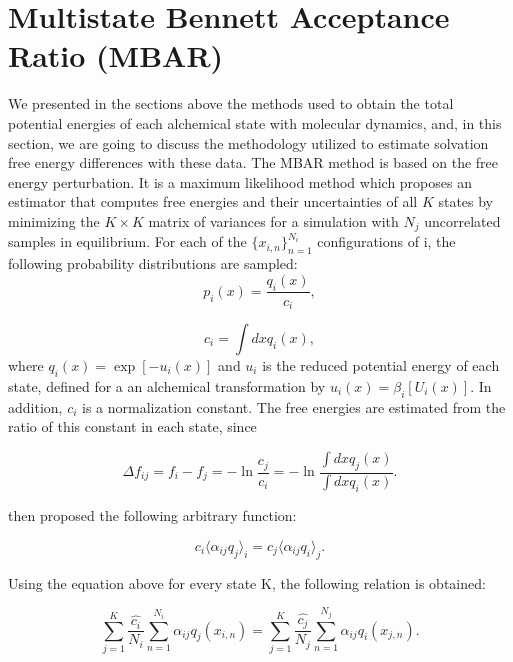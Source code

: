 \section{Multistate Bennett Acceptance Ratio (MBAR)}\label{mbar}

We presented in the sections above the methods used to obtain the total potential energies of each alchemical state with molecular dynamics, and, in this section, we are going to discuss the methodology utilized to estimate solvation free energy differences with these data. The MBAR method \cite{mbar} is based on the free energy perturbation. It is a maximum likelihood method which proposes an estimator that computes free energies and their uncertainties of all $K$ states by minimizing the $K \times K$ matrix of variances for a simulation with $N_{j}$ uncorrelated samples in equilibrium. For each of the $\lbrace x_{i,n } \rbrace ^{N_{i}}_{n=1 }$ configurations of i, the following probability distributions are sampled:
\begin{equation}
p_{i}(x) = \frac{q_{i}(x)}{c_{i}},
\end{equation}

\begin{equation}
c_{i} = \int dx q_{i}(x),
\end{equation}
where $q_{i}(x)=\exp[-u_{i}(x)]$ and $u_{i}$ is the reduced potential energy of each state, defined for a an alchemical transformation by $u_{i} (x)= \beta_{i} [U_{i}(x)]$. In addition, $c_{i}$ is a normalization constant.  The free energies are estimated from the ratio of this constant in each state, since

\begin{equation}
\Delta f_{ij} = f_{i} - f_{j} = - \ln \frac{c_{j}}{c_{i}}  = -\ln \frac{\int dx q_{j}(x)}{\int dx q_{i}(x)} .
\label{eqn:mbar1}
\end{equation}

 then proposed the following arbitrary function:

\begin{equation}
c_{i} \langle \alpha _{ij} q_{j} \rangle _{i}  =  c_{j} \langle \alpha _{ij} q_{i} \rangle _{j} .
\end{equation}

Using the equation above for every state  K, the following relation is obtained:

\begin{equation}
\label{eq:mbar1}
\sum_{j=1}^{K} \frac{\hat{c_{i}}}{N_{i}} \sum_{n=1}^{N_{i}} \alpha _{ij} q_{j} (x_{i,n}) =  \sum_{j=1}^{K} \frac{\hat{c_{j}}}{N_{j}} \sum_{n=1}^{N_{j}} \alpha _{ij} q_{i} (x_{j,n}) .
\end{equation}

